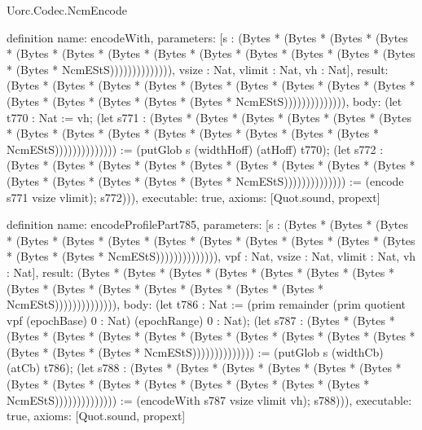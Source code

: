 \begin{lexlean}{Uorc.Codec.NcmEncode}
\begin{semanticmodule}
definition{
  name: encodeWith,
  parameters: [s : (Bytes * (Bytes * (Bytes * (Bytes * (Bytes * (Bytes * (Bytes * (Bytes * (Bytes * (Bytes * (Bytes * (Bytes * (Bytes * (Bytes * NcmEStS)))))))))))))), vsize : Nat, vlimit : Nat, vh : Nat],
  result: (Bytes * (Bytes * (Bytes * (Bytes * (Bytes * (Bytes * (Bytes * (Bytes * (Bytes * (Bytes * (Bytes * (Bytes * (Bytes * (Bytes * NcmEStS)))))))))))))),
  body: (let t770 : Nat := vh; (let s771 : (Bytes * (Bytes * (Bytes * (Bytes * (Bytes * (Bytes * (Bytes * (Bytes * (Bytes * (Bytes * (Bytes * (Bytes * (Bytes * (Bytes * NcmEStS)))))))))))))) := (putGlob s (widthHoff) (atHoff) t770); (let s772 : (Bytes * (Bytes * (Bytes * (Bytes * (Bytes * (Bytes * (Bytes * (Bytes * (Bytes * (Bytes * (Bytes * (Bytes * (Bytes * (Bytes * NcmEStS)))))))))))))) := (encode s771 vsize vlimit); s772))),
  executable: true,
  axioms: [Quot.sound, propext]
}

definition{
  name: encodeProfilePart785,
  parameters: [s : (Bytes * (Bytes * (Bytes * (Bytes * (Bytes * (Bytes * (Bytes * (Bytes * (Bytes * (Bytes * (Bytes * (Bytes * (Bytes * (Bytes * NcmEStS)))))))))))))), vpf : Nat, vsize : Nat, vlimit : Nat, vh : Nat],
  result: (Bytes * (Bytes * (Bytes * (Bytes * (Bytes * (Bytes * (Bytes * (Bytes * (Bytes * (Bytes * (Bytes * (Bytes * (Bytes * (Bytes * NcmEStS)))))))))))))),
  body: (let t786 : Nat := (prim remainder (prim quotient vpf (epochBase) 0 : Nat) (epochRange) 0 : Nat); (let s787 : (Bytes * (Bytes * (Bytes * (Bytes * (Bytes * (Bytes * (Bytes * (Bytes * (Bytes * (Bytes * (Bytes * (Bytes * (Bytes * (Bytes * NcmEStS)))))))))))))) := (putGlob s (widthCb) (atCb) t786); (let s788 : (Bytes * (Bytes * (Bytes * (Bytes * (Bytes * (Bytes * (Bytes * (Bytes * (Bytes * (Bytes * (Bytes * (Bytes * (Bytes * (Bytes * NcmEStS)))))))))))))) := (encodeWith s787 vsize vlimit vh); s788))),
  executable: true,
  axioms: [Quot.sound, propext]
}


\end{semanticmodule}
\end{lexlean}
